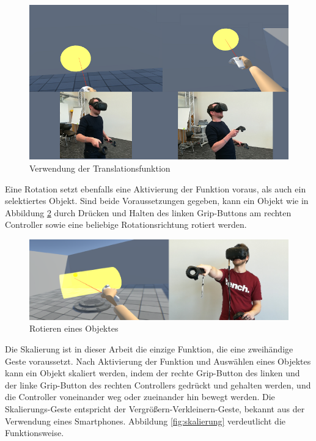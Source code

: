 \begin{figure}[h]
\captionsetup{width=.7\linewidth}
\includegraphics[scale=0.6]{Bilder/Hauptteil/Bearbeitet/TranslationMerge}
\centering
\caption{Verwendung der Translationsfunktion}
\label{fig:translation}
\end{figure}

\noindent Eine Rotation setzt ebenfalls eine Aktivierung der Funktion voraus, als auch ein selektiertes Objekt. Sind beide Voraussetzungen gegeben, kann ein Objekt wie in Abbildung \ref{fig:rotation} durch Drücken und Halten des linken Grip-Buttons am rechten Controller sowie eine beliebige Rotationsrichtung rotiert werden.

\begin{figure}[h]
\captionsetup{width=.7\linewidth}
\includegraphics[scale=0.35]{Bilder/Hauptteil/Bearbeitet/RotationMerge}
\centering
\caption{Rotieren eines Objektes}
\label{fig:rotation}
\end{figure}

\noindent Die Skalierung ist in dieser Arbeit die einzige Funktion, die eine zweihändige Geste voraussetzt. Nach Aktivierung der Funktion und Auswählen eines Objektes kann ein Objekt skaliert werden, indem der rechte Grip-Button des linken und der linke Grip-Button des rechten Controllers gedrückt und gehalten werden, und die Controller voneinander weg oder zueinander hin bewegt werden. Die Skalierungs-Geste entspricht der Vergrößern-Verkleinern-Geste, bekannt aus der Verwendung eines Smartphones. Abbildung \ref{fig:skalierung} verdeutlicht die Funktionsweise.

